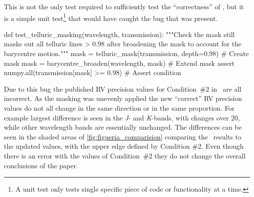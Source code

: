 This is not the only test required to sufficiently test the ``correctness'' of , but it is a simple unit test\footnote{A unit test only tests  single specific piece of code or functionality at a time.} that would have caught the bug that was present.
\begin{python}[caption={Example unit test to catch the masking bug.\ The assert statement checks that the mask continues to remove all telluric lines deeper than 2\%.}, label={lst:masking_unit_test}]
def test_telluric_masking(wavelength, transmission):
    """Check the mask still masks out all telluric lines > 0.98 after
    broadening the mask to account for the barycentre motion."""
    mask = telluric_mask(transmission, depth=0.98)  # Create mask
    mask = barycentre_broaden(wavelength, mask)     # Extend mask
    assert numpy.all(transmission[mask] >= 0.98)    # Assert condition
\end{python}
Due to this bug the published {RV} precision values for Condition~\#2  in~\citet{figueira_radial_2016} are all incorrect.
As the masking was unevenly applied the new ``correct'' {RV} precision values do not all change in the same direction or in the same proportion.
For example largest difference is seen in the \emph{J}- and \emph{K}-bands, with changes over 20\mps{}, while other wavelength bands are essentially unchanged.
The differences can be seen in the shaded areas of \cref{fig:figueria_comparision} comparing the~\citet{figueira_radial_2016} results to the updated values, with the upper edge defined by Condition \#2.
Even though there is an error with the values of Condition~\#2 they do not change the overall conclusions of the paper.
